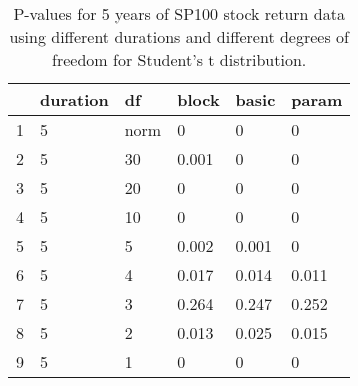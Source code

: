 \begin{table}[ht]
\centering
\caption{P-values for 5 years of SP100 stock return 
                   data using different durations
  and different degrees of freedom for Student's t distribution.} 
\label{table:SP1005}
\begin{tabular}{rlllll}
  \hline
 & duration & df & block & basic & param \\ 
  \hline
1 & 5 & norm & 0 & 0 & 0 \\ 
  2 & 5 & 30 & 0.001 & 0 & 0 \\ 
  3 & 5 & 20 & 0 & 0 & 0 \\ 
  4 & 5 & 10 & 0 & 0 & 0 \\ 
  5 & 5 & 5 & 0.002 & 0.001 & 0 \\ 
  6 & 5 & 4 & 0.017 & 0.014 & 0.011 \\ 
  7 & 5 & 3 & 0.264 & 0.247 & 0.252 \\ 
  8 & 5 & 2 & 0.013 & 0.025 & 0.015 \\ 
  9 & 5 & 1 & 0 & 0 & 0 \\ 
   \hline
\end{tabular}
\end{table}


